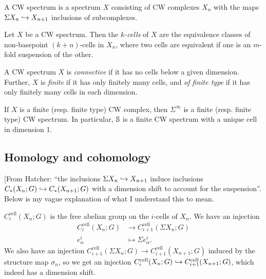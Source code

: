 \documentclass{MetricNotes2023}
\def\bb{\ensuremath\mathbb}
\def\inj{\ensuremath\hookrightarrow}
\begin{document}
\begin{definition}
A CW spectrum is a spectrum \(X\) consisting of CW complexes \(X_n\) with the maps \(\Sigma X_n \inj X_{n+1}\) inclusions of subcomplexes. 
\end{definition}

\begin{definition}
Let \(X\) be a CW spectrum. Then the \textit{\(k\)-cells} of \(X\) are the equivalence classes of non-basepoint \((k+n)\)-cells in \(X_n\), where two cells are equivalent if one is an \(m\)-fold suspension of the other. 
\end{definition}


\begin{definition}
A CW spectrum \(X\) is \textit{connective} if it has no cells below a given dimension. Further, \(X\) is \textit{finite} if it has only finitely many cells, and \textit{of finite type} if it has only finitely many cells in each dimension.
\end{definition}

\begin{example}
If \(X\) is a finite (resp. finite type) CW complex, then \(\Sigma^\infty\) is a finite (resp. finite type) CW spectrum. In particular, \(\bb{S}\) is a finite CW spectrum with a unique cell in dimension 1.
\end{example}

\subsection{Homology and cohomology}

[From Hatcher: ``the inclusions \(\Sigma X_n \inj X_{n+1}\) induce inclusions \(C_*(X_n; G)\inj C_*(X_{n+1}; G)\) with a dimension shift to account for the suspension''. Below is my vague explanation of what I understand this to mean.

\(C^\text{cell}_i(X_n; G)\) is the free abelian group on the \(i\)-cells of \(X_n\). We have an injection
\begin{align*}
C_i^\text{cell}(X_n;G) &\to C_{i+1}^\text{cell}(\Sigma X_n; G)\\
e^i_\alpha &\mapsto \Sigma e^i_\alpha.
\end{align*}
We also have an injection \(C^\text{cell}_{i+1}(\Sigma X_n; G)\to C^\text{cell}_{i+1}(X_{n+1}; G)\) induced by the structure map \(\sigma_n\), so we get an injection \(C^\text{cell}_i(X_n;G)\inj C^\text{cell}_{i+1}(X_{n+1};G)\), which indeed has a dimension shift.
\end{document}
